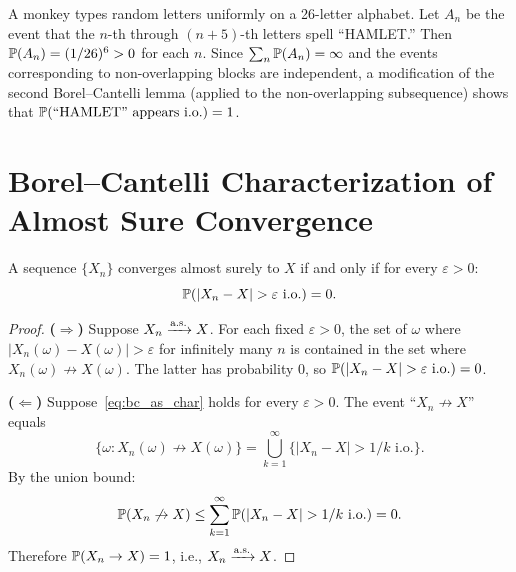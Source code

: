 \documentclass[11pt,a4paper]{article}
\begin{document}
\begin{example}
\label{ex:monkey}
A monkey types random letters uniformly on a 26-letter alphabet.
Let $A_n$ be the event that the $n$-th through $(n+5)$-th letters
spell ``HAMLET.''  Then $\mathbb{P}(A_n) = (1/26)^6 > 0$ for each
$n$.  Since $\sum_n \mathbb{P}(A_n) = \infty$ and the events
corresponding to non-overlapping blocks are independent, a
modification of the second Borel--Cantelli lemma (applied to the
non-overlapping subsequence) shows that
$\mathbb{P}(\text{``HAMLET'' appears i.o.}) = 1$.
\end{example}


\section{Borel--Cantelli Characterization of Almost Sure
  Convergence}
\label{sec:bc_characterization}

\begin{theorem}
\label{thm:bc_as}
A sequence $\{X_n\}$ converges almost surely to $X$ if and only
if for every $\varepsilon > 0$:
\begin{equation}
  \mathbb{P}\!\left(|X_n - X| > \varepsilon \text{ i.o.}\right) = 0.
  \label{eq:bc_as_char}
\end{equation}
\end{theorem}

\begin{proof}
\textbf{($\Rightarrow$)} Suppose $X_n \xrightarrow{\text{a.s.}} X$.  For each fixed
$\varepsilon > 0$, the set of $\omega$ where
$|X_n(\omega) - X(\omega)| > \varepsilon$ for infinitely many
$n$ is contained in the set where $X_n(\omega) \not\to X(\omega)$.
The latter has probability $0$, so
$\mathbb{P}(|X_n - X| > \varepsilon \text{ i.o.}) = 0$.

\textbf{($\Leftarrow$)} Suppose~\eqref{eq:bc_as_char} holds for
every $\varepsilon > 0$.  The event ``$X_n \not\to X$'' equals
\begin{equation}
  \{\omega : X_n(\omega) \not\to X(\omega)\}
  = \bigcup_{k=1}^\infty
    \{|X_n - X| > 1/k \text{ i.o.}\}.
\end{equation}
By the union bound:
\begin{equation}
  \mathbb{P}(X_n \not\to X)
  \leq \sum_{k=1}^\infty
    \mathbb{P}(|X_n - X| > 1/k \text{ i.o.}) = 0.
\end{equation}
Therefore $\mathbb{P}(X_n \to X) = 1$, i.e., $X_n \xrightarrow{\text{a.s.}} X$.
\end{proof}
\end{document}
